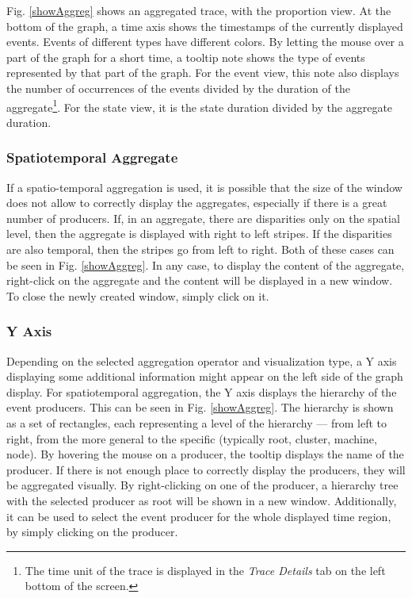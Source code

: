 \documentclass[twoside]{article}
\begin{document}
\begin{sloppypar}
Fig. \ref{showAggreg} shows an aggregated trace, with the proportion view. At the bottom of the graph, a time axis shows the timestamps of the currently displayed events. Events of different types have different colors. By letting the mouse over a part of the graph for a short time, a tooltip note shows the type of events represented by that part of the graph. For the event view, this note also displays the number of occurrences of the events divided by the duration of the aggregate\footnote{The time unit of the trace is displayed in the \textit{Trace Details} tab on the left bottom of the screen.}. For the state view, it is the state duration divided by the aggregate duration.

\subsubsection{Spatiotemporal Aggregate}
If a spatio-temporal aggregation is used, it is possible that the size of the window does not allow to correctly display the aggregates, especially if there is a great number of producers. If, in an aggregate, there are disparities only on the spatial level, then the aggregate is displayed with right to left stripes. If the disparities are also temporal, then the stripes go from left to right. Both of these cases can be seen in Fig. \ref{showAggreg}. In any case, to display the content of the aggregate, right-click on the aggregate and the content will be displayed in a new window. To close the newly created window, simply click on it.

\subsubsection{Y Axis}
Depending on the selected aggregation operator and visualization type, a Y axis displaying some additional information might appear on the left side of the graph display. For spatiotemporal aggregation, the Y axis displays the hierarchy of the event producers. This can be seen in Fig. \ref{showAggreg}. The hierarchy is shown as a set of rectangles, each representing a level of the hierarchy --- from left to right, from the more general to the specific (typically root, cluster, machine, node). By hovering the mouse on a producer, the tooltip displays the name of the producer. If there is not enough place to correctly display the producers, they will be aggregated visually. By right-clicking on one of the producer, a hierarchy tree with the selected producer as root will be shown in a new window. Additionally, it can be used to select the event producer for the whole displayed time region, by simply clicking on the producer.


\end{sloppypar}
\end{document}
